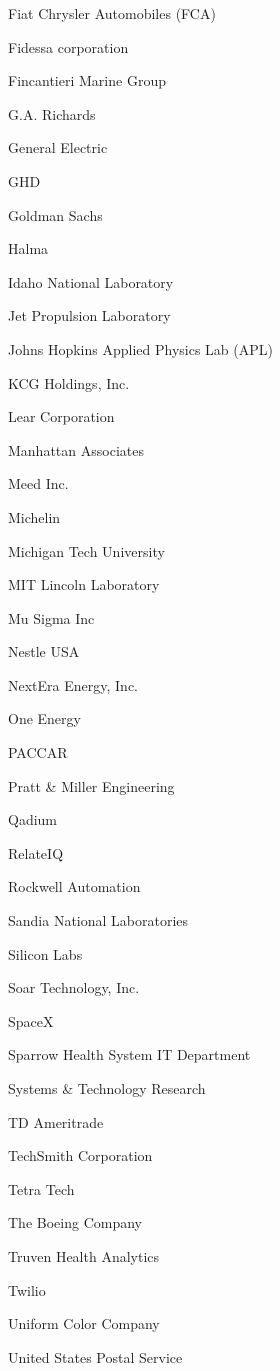 \documentclass[twoside]{article}
\begin{document}
\begin{center}
\begin{multicols}{5}
\begin{FlushLeft}
\begin{compactitem}
\item Fiat Chrysler Automobiles (FCA)
\item Fidessa corporation
\item Fincantieri Marine Group
\item G.A. Richards
\item General Electric
\item GHD
\item Goldman Sachs
\item Halma
\item Idaho National Laboratory
\item Jet Propulsion Laboratory
\item Johns Hopkins Applied Physics Lab (APL)
\item KCG Holdings, Inc.
\item Lear Corporation
\item Manhattan Associates
\item Meed Inc.
\item Michelin
\item Michigan Tech University
\item MIT Lincoln Laboratory
\item Mu Sigma Inc
\item Nestle USA
\item NextEra Energy, Inc.
\item One Energy
\item PACCAR
\item Pratt \& Miller Engineering
\item Qadium
\item RelateIQ
\item Rockwell Automation
\item Sandia National Laboratories
\item Silicon Labs
\item Soar Technology, Inc.
\item SpaceX
\item Sparrow Health System IT Department
\item Systems \& Technology Research
\item TD Ameritrade
\item TechSmith Corporation
\item Tetra Tech
\item The Boeing Company
\item Truven Health Analytics
\item Twilio
\item Uniform Color Company
\item United States Postal Service

\end{compactitem}
\end{FlushLeft}
\end{multicols}
\end{center}
\end{document}
